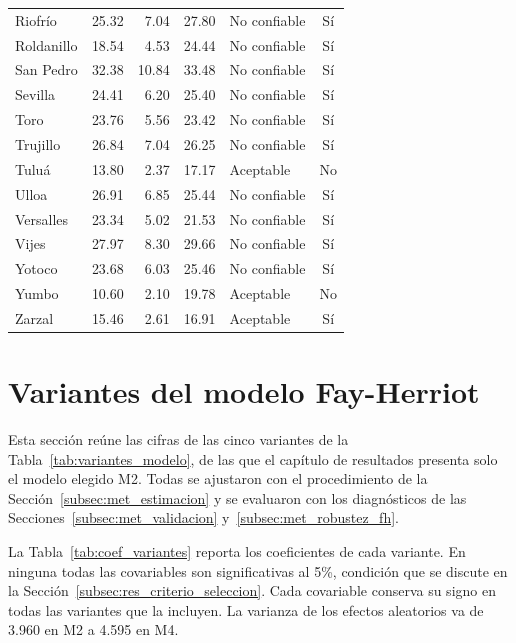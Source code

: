 \begin{longtable}{p{3.4cm} r r r l c}
Riofrío & 25.32 & 7.04 & 27.80 & No confiable & Sí \\
Roldanillo & 18.54 & 4.53 & 24.44 & No confiable & Sí \\
San Pedro & 32.38 & 10.84 & 33.48 & No confiable & Sí \\
Sevilla & 24.41 & 6.20 & 25.40 & No confiable & Sí \\
Toro & 23.76 & 5.56 & 23.42 & No confiable & Sí \\
Trujillo & 26.84 & 7.04 & 26.25 & No confiable & Sí \\
Tuluá & 13.80 & 2.37 & 17.17 & Aceptable & No \\
Ulloa & 26.91 & 6.85 & 25.44 & No confiable & Sí \\
Versalles & 23.34 & 5.02 & 21.53 & No confiable & Sí \\
Vijes & 27.97 & 8.30 & 29.66 & No confiable & Sí \\
Yotoco & 23.68 & 6.03 & 25.46 & No confiable & Sí \\
Yumbo & 10.60 & 2.10 & 19.78 & Aceptable & No \\
Zarzal & 15.46 & 2.61 & 16.91 & Aceptable & Sí \\
\end{longtable}
\normalsize

\section{Variantes del modelo Fay-Herriot}
\label{sec:apendice-variantes}

    Esta sección reúne las cifras de las cinco variantes de la Tabla~\ref{tab:variantes_modelo}, de las que el capítulo de resultados presenta solo el modelo elegido M2. Todas se ajustaron con el procedimiento de la Sección~\ref{subsec:met_estimacion} y se evaluaron con los diagnósticos de las Secciones~\ref{subsec:met_validacion} y~\ref{subsec:met_robustez_fh}.

    La Tabla~\ref{tab:coef_variantes} reporta los coeficientes de cada variante. En ninguna todas las covariables son significativas al 5\%, condición que se discute en la Sección~\ref{subsec:res_criterio_seleccion}. Cada covariable conserva su signo en todas las variantes que la incluyen. La varianza de los efectos aleatorios va de 3.960 en M2 a 4.595 en M4.

